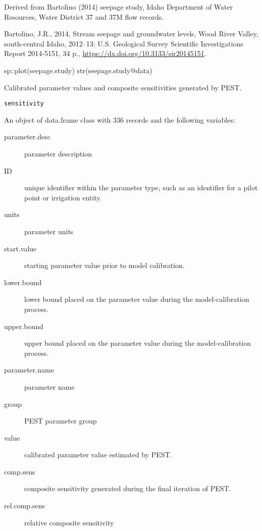\documentclass[a4paper]{book}
\begin{document}
%
\begin{Source}\relax
Derived from Bartolino (2014) seepage study,
Idaho Department of Water Resources, Water District 37 and 37M flow records.
\end{Source}
%
\begin{References}\relax
Bartolino, J.R., 2014, Stream seepage and groundwater levels, Wood River Valley,
south-central Idaho, 2012--13: U.S. Geological Survey Scientific Investigations Report 2014-5151,
34 p., \url{https://dx.doi.org/10.3133/sir20145151}.
\end{References}
%
\begin{Examples}
\begin{ExampleCode}
sp::plot(seepage.study)
str(seepage.study@data)

\end{ExampleCode}
\end{Examples}
%
\begin{Description}\relax
Calibrated parameter values and composite sensitivities generated by PEST.
\end{Description}
%
\begin{Usage}
\begin{verbatim}
sensitivity
\end{verbatim}
\end{Usage}
%
\begin{Format}
An object of data.frame class with 336 records and the following variables:
\begin{description}

\item[parameter.desc] parameter description
\item[ID] unique identifier within the parameter type,
such as an identifier for a pilot point or irrigation entity.
\item[units] parameter units
\item[start.value] starting parameter value prior to model calibration.
\item[lower.bound] lower bound placed on the parameter value
during the model-calibration process.
\item[upper.bound] upper bound placed on the parameter value
during the model-calibration process.
\item[parameter.name]  parameter name
\item[group] PEST parameter group
\item[value] calibrated parameter value estimated by PEST.
\item[comp.sens] composite sensitivity generated during the final iteration of PEST.
\item[rel.comp.sens] relative composite sensitivity

\end{description}
\end{Format}
\end{document}
